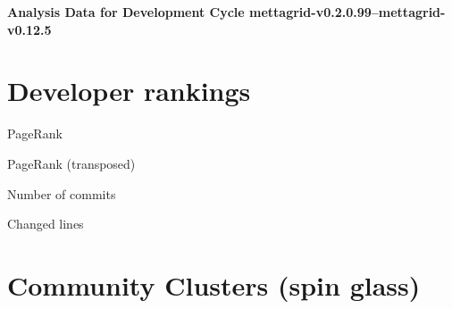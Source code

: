 \documentclass{article}
\begin{document}
\setlength{\parindent}{0pt}
\begin{center}
\begin{Large}
\textbf{Analysis Data for Development Cycle mettagrid-v0.2.0.99--mettagrid-v0.12.5}
\end{Large}
\end{center}
\section{Developer rankings}
\begin{small}\renewcommand{\tabcolsep}{1pt}
\begin{minipage}{0.5\linewidth}
PageRank\\

\end{minipage}%
\begin{minipage}{0.5\linewidth}
PageRank (transposed)\\

\end{minipage}

\renewcommand{\tabcolsep}{5pt}
\begin{minipage}{0.5\linewidth}
Number of commits\\

\end{minipage}%
\begin{minipage}{0.5\linewidth}
Changed lines\\

\end{minipage}
\end{small}
\newpage\section{Community Clusters (spin glass)}
\end{document}
